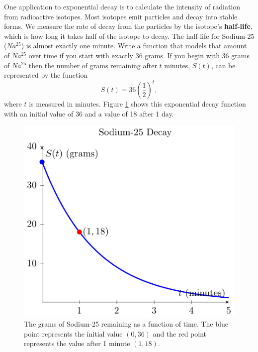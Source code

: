 \bex
One application to exponential decay is to calculate the intensity of radiation from
radioactive isotopes.  Most isotopes emit particles and decay into stable forms.  We
measure the rate of decay from the particles by the isotope's {\bf half-life}, which is
how long it takes half of the isotope to decay.  The half-life for Sodium-25 ($Na^{25}$)
is almost exactly one minute.  Write a function that models that amount of $Na^{25}$ over
time if you start with exactly 36 grams.    
\eex
If you begin with 36 grams of $Na^{25}$ then the number of
grams remaining after $t$ minutes, $S(t)$, can be represented by the function
\[ S(t) = 36 \left( \frac{1}{2} \right)^{t}, \]
where $t$ is measured in minutes. Figure \ref{F:0.2.Ex1} shows this exponential decay
function with an initial value of 36 and a value of 18 after 1 day.
\begin{figure}[ht!]
    \begin{center}
        \includegraphics[width=0.5\columnwidth]{figures/0-2-fig2.pdf}
    \end{center}
    \caption{The grams of Sodium-25 remaining as a function of time. The blue point
    represents the initial value $(0,36)$ and the red point represents the value after 1
minute $(1,18)$.}
    \label{F:0.2.Ex1}
\end{figure}
\afterex

